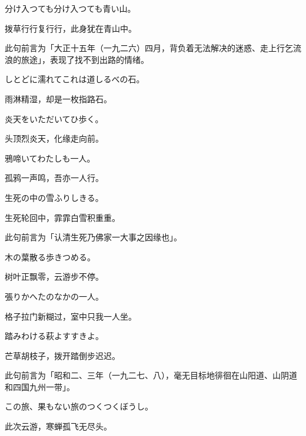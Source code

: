 \begin{haiku}
    {\FH 分け入つても分け入つても青い山。}

    {\FK 拨草行行复行行，此身犹在青山中。}

    {\FS 此句前言为「大正十五年（一九二六）四月，背负着无法解决的迷惑、走上行乞流浪的旅途」，表现了找不到出路的情绪。}
\end{haiku}

\begin{haiku}
    {\FH しとどに濡れてこれは道しるべの石。}

    {\FK 雨淋精湿，却是一枚指路石。}
\end{haiku}

\begin{haiku}
    {\FH 炎天をいただいてひ歩く。}

    {\FK 头顶烈炎天，化缘走向前。}
\end{haiku}

\begin{haiku}
    {\FH 鴉啼いてわたしも一人。}

    {\FK 孤鸦一声鸣，吾亦一人行。}
\end{haiku}

\begin{haiku}
    {\FH 生死の中の雪ふりしきる。}

    {\FK 生死轮回中，霏霏白雪积重重。}

    {\FS 此句前言为「认清生死乃佛家一大事之因缘也」。}
\end{haiku}

\begin{haiku}
    {\FH 木の葉散る歩きつめる。}

    {\FK 树叶正飘零，云游步不停。}
\end{haiku}

\begin{haiku}
    {\FH 張りかへたのなかの一人。}

    {\FK 格子拉门新糊过，室中只我一人坐。}
\end{haiku}

\begin{haiku}
    {\FH 踏みわける萩よすすきよ。}

    {\FK 芒草胡枝子，拨开踏倒步迟迟。}

    {\FS 此句前言为「昭和二、三年（一九二七、八），毫无目标地徘徊在山阳道、山阴道和四国九州一带」。}
\end{haiku}

\begin{haiku}
    {\FH この旅、果もない旅のつくつくぼうし。}

    {\FK 此次云游，寒蝉孤飞无尽头。}
\end{haiku}

